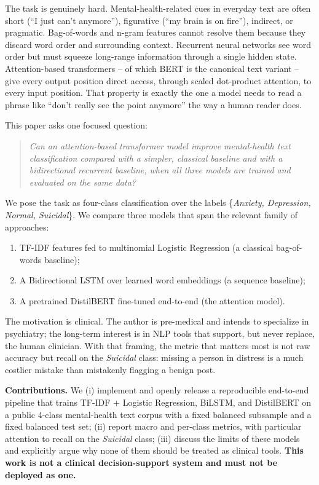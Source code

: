 \documentclass[12pt]{article}
\begin{document}
The task is genuinely hard. Mental-health-related cues in everyday
text are often short (``I just can't anymore''), figurative
(``my brain is on fire''), indirect, or pragmatic. Bag-of-words and
n-gram features cannot resolve them because they discard word order
and surrounding context. Recurrent neural networks see word order but
must squeeze long-range information through a single hidden state.
Attention-based transformers \cite{vaswani2017attention} -- of which
BERT \cite{devlin2019bert} is the canonical text variant -- give every
output position direct access, through scaled dot-product attention, to
every input position. That property is exactly the one a model needs
to read a phrase like ``don't really see the point anymore'' the way a
human reader does.

This paper asks one focused question:

\begin{quote}
\emph{Can an attention-based transformer model improve mental-health
text classification compared with a simpler, classical baseline and
with a bidirectional recurrent baseline, when all three models are
trained and evaluated on the same data?}
\end{quote}

We pose the task as four-class classification over the labels
\{\textit{Anxiety, Depression, Normal, Suicidal}\}. We compare three
models that span the relevant family of approaches:

\begin{enumerate}[leftmargin=*]
\item TF-IDF features fed to multinomial Logistic Regression (a
classical bag-of-words baseline);
\item A Bidirectional LSTM \cite{hochreiter1997lstm,schuster1997bilstm}
over learned word embeddings (a sequence baseline);
\item A pretrained DistilBERT \cite{sanh2019distilbert} fine-tuned
end-to-end (the attention model).
\end{enumerate}

The motivation is clinical. The author is pre-medical and intends to
specialize in psychiatry; the long-term interest is in NLP tools that
support, but never replace, the human clinician. With that framing,
the metric that matters most is not raw accuracy but recall on the
\textit{Suicidal} class: missing a person in distress is a much
costlier mistake than mistakenly flagging a benign post.

\textbf{Contributions.} We (i) implement and openly release a
reproducible end-to-end pipeline that trains TF-IDF + Logistic
Regression, BiLSTM, and DistilBERT on a public 4-class mental-health
text corpus with a fixed balanced subsample and a fixed balanced test
set; (ii) report macro and per-class metrics, with particular
attention to recall on the \textit{Suicidal} class; (iii) discuss the
limits of these models and explicitly argue why none of them should be
treated as clinical tools. \textbf{This work is not a clinical
decision-support system and must not be deployed as one.}
\end{document}
